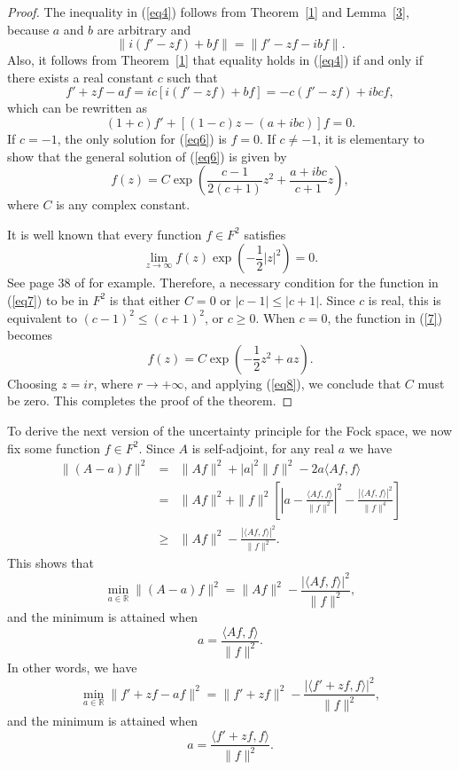 \documentclass[12pt,reqno]{amsart}
\begin{document}
\begin{proof}
The inequality in (\ref{eq4}) follows from Theorem~\ref{1} and Lemma~\ref{3}, because $a$ and $b$ are arbitrary and
$$\|i(f'-zf)+bf\|=\|f'-zf-ibf\|.$$ 
Also, it follows from Theorem~\ref{1} that equality holds in (\ref{eq4}) if and only if there exists a real constant $c$ such that
\begin{equation}
f'+zf-af=ic\left[i(f'-zf)+bf\right]=-c(f'-zf)+ibcf,
\label{eq5}
\end{equation}
which can be rewritten as
\begin{equation}
(1+c)f'+\left[(1-c)z-(a+ibc)\right]f=0.
\label{eq6}
\end{equation}
If $c=-1$, the only solution for (\ref{eq6}) is $f=0$. If $c\not=-1$, it is elementary to show that the general solution 
of (\ref{eq6}) is given by
\begin{equation}
f(z)=C\exp\left(\frac{c-1}{2(c+1)}z^2+\frac{a+ibc}{c+1}z\right),
\label{eq7}
\end{equation}
where $C$ is any complex constant. 

It is well known that every function $f\in F^2$ satisfies
\begin{equation}
\lim_{z\to\infty}f(z)\exp\left(-\frac12|z|^2\right)=0.
\label{eq8}
\end{equation}
See page 38 of \cite{Z} for example. Therefore, a necessary condition for the function in (\ref{eq7})
to be in $F^2$ is that either $C=0$ or $|c-1|\le|c+1|$. Since $c$ is real, this is equivalent to $(c-1)^2\le(c+1)^2$,
or $c\ge0$. When $c=0$, the function in (\ref{7}) becomes
$$f(z)=C\exp\left(-\frac12z^2+az\right).$$
Choosing $z=ir$, where $r\to+\infty$, and applying (\ref{eq8}), we conclude that $C$ must be zero.
This completes the proof of the theorem.
\end{proof}

To derive the next version of the uncertainty principle for the Fock space, we now fix some function
$f\in F^2$. Since $A$ is self-adjoint, for any real $a$ we have
\begin{eqnarray*}
\|(A-a)f\|^2&=&\|Af\|^2+|a|^2\|f\|^2-2a\langle Af,f\rangle\\
&=&\|Af\|^2+\|f\|^2\left[\left|a-\frac{\langle Af,f\rangle}{\|f\|^2}\right|^2-\frac{|\langle Af,f\rangle|^2}{\|f\|^4}\right]\\
&\ge&\|Af\|^2-\frac{|\langle Af,f\rangle|^2}{\|f\|^2}.
\end{eqnarray*}
This shows that
$$\min_{a\in{{\mathbb R}}}\|(A-a)f\|^2=\|Af\|^2-\frac{|\langle Af,f\rangle|^2}{\|f\|^2},$$
and the minimum is attained when
$$a=\frac{\langle Af,f\rangle}{\|f\|^2}.$$
In other words, we have
$$\min_{a\in{{\mathbb R}}}\|f'+zf-af\|^2=\|f'+zf\|^2-\frac{|\langle f'+zf,f\rangle|^2}{\|f\|^2},$$
and the minimum is attained when
$$a=\frac{\langle f'+zf,f\rangle}{\|f\|^2}.$$
\end{document}
